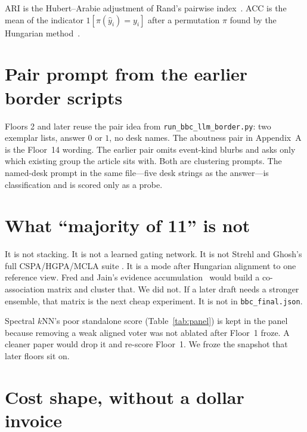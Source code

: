 \documentclass[11pt,a4paper]{article}
\begin{document}
ARI is the Hubert--Arabie adjustment of Rand's pairwise
index~\cite{rand1971,hubert1985ari}. ACC is the mean of
the indicator $1[\pi(\hat{y}_i)=y_i]$ after a permutation
$\pi$ found by the Hungarian method~\cite{kuhn1955hungarian}.

\section{Pair prompt from the earlier border scripts}

Floors 2 and later reuse the pair idea from
\texttt{run\_bbc\_llm\_border.py}: two exemplar lists, answer
$0$ or $1$, no desk names. The aboutness pair in Appendix~A
is the Floor~14 wording. The earlier pair omits event-kind
blurbs and asks only which existing group the article sits
with. Both are clustering prompts. The named-desk prompt in
the same file---five desk strings as the answer---is
classification and is scored only as a probe.

\section{What ``majority of 11'' is not}

It is not stacking. It is not a learned gating network. It
is not Strehl and Ghosh's full CSPA/HGPA/MCLA suite
\cite{strehl2002cluster}. It is a mode after Hungarian
alignment to one reference view. Fred and Jain's evidence
accumulation~\cite{fred2005eac} would build a co-association
matrix and cluster that. We did not. If a later draft needs
a stronger ensemble, that matrix is the next cheap
experiment. It is not in \texttt{bbc\_final.json}.

Spectral $k$NN's poor standalone score (Table~\ref{tab:panel})
is kept in the panel because removing a weak aligned voter
was not ablated after Floor~1 froze. A cleaner paper would
drop it and re-score Floor~1. We froze the snapshot that
later floors sit on.

\section{Cost shape, without a dollar invoice}
\end{document}
